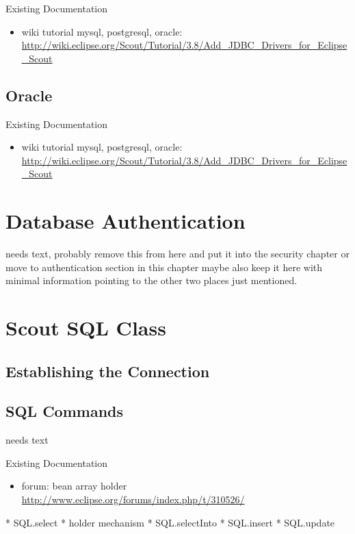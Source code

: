 \documentclass[a4paper,10pt,twoside]{book}
\begin{document}
\noindent Existing Documentation
\begin{itemize}
  \item wiki tutorial mysql, postgresql, oracle: \url{http://wiki.eclipse.org/Scout/Tutorial/3.8/Add_JDBC_Drivers_for_Eclipse_Scout}
\end{itemize}

\subsection{Oracle}

\noindent Existing Documentation
\begin{itemize}
  \item wiki tutorial mysql, postgresql, oracle: \url{http://wiki.eclipse.org/Scout/Tutorial/3.8/Add_JDBC_Drivers_for_Eclipse_Scout}
\end{itemize}

\section{Database Authentication}
needs text, probably remove this from here and put it into the security chapter or move to authentication section in this chapter
maybe also keep it here with minimal information pointing to the other two places just mentioned.

\section{Scout SQL Class}

\subsection{Establishing the Connection}

\subsection{SQL Commands}
needs text

\noindent Existing Documentation
\begin{itemize}
  \item forum: bean array holder \url{http://www.eclipse.org/forums/index.php/t/310526/}
\end{itemize}

* SQL.select
* holder mechanism
* SQL.selectInto
* SQL.insert
* SQL.update
\end{document}
